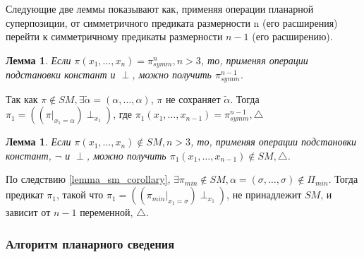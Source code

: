 \documentclass[12pt]{article}
\newtheorem{lemma}[theorem]{Лемма}
\newenvironment{proof}[1][Доказательство]{\begin{trivlist}
\item[\hskip \labelsep {\bfseries #1}]}{\end{trivlist}}
\begin{document}
Следующие две леммы показывают как, применяя операции планарной суперпозиции, от симметричного предиката
размерности n (его расширения) перейти к симметричному предикаты размерности $n-1$ (его расширению).

\begin{lemma}
\label{eq:svedenie1}
Если $\pi(x_1, \dots, x_n) = \pi_{symm}^n, n > 3$, то, 
применяя операции подстановки констант и $\perp$, можно получить $\pi_{symm}^{n-1}$.
\end{lemma}

\begin{proof}
Так как 
$\pi \notin SM, \exists \widetilde{\alpha} = (\alpha, \dots, \alpha)$, $\pi$ не сохраняет $\widetilde{\alpha}$.
Тогда 
$\pi_1 = ( (\pi|_{x_1=\alpha}) \perp_{x_1} )$, где $\pi_1(x_1, \dots, x_{n-1}) = \pi_{symm}^{n-1}, \bigtriangleup$
\end{proof}

\begin{lemma}
\label{eq:svedenie2}
Если $\pi(x_1, \dots, x_n) \notin SM, n > 3$, то, применяя операции подстановки констант, $\neg$ и $\perp$,
можно получить $\pi_1(x_1, \dots, x_{n-1}) \notin SM, \bigtriangleup$.
\end{lemma}

\begin{proof}
По следствию \ref{lemma_sm_corollary}, 
$\exists \pi_{min} \notin SM, \alpha=(\sigma, \dots, \sigma) \notin \Pi_{min}$. Тогда предикат $\pi_1$, такой что
$\pi_1 = ( (\pi_{min}|_{x_1=\sigma}) \perp_{x_1} )$, не принадлежит $SM$, и зависит от $n-1$ переменной, $\bigtriangleup$.
\end{proof}

\subsubsection{Алгоритм планарного сведения}
\end{document}
